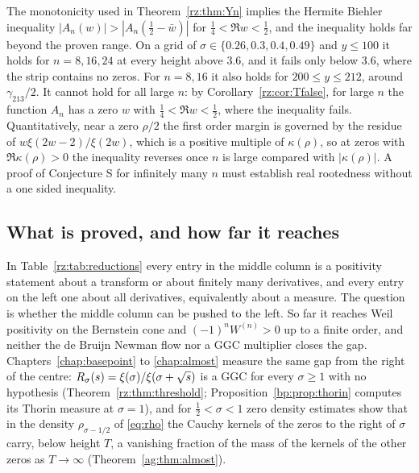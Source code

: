 The monotonicity used in Theorem~\ref{rz:thm:Yn} implies the Hermite Biehler inequality $|A_n(w)|>|A_n(\frac12-\bar w)|$ for $\frac14<\Re w<\frac12$, and the inequality holds far beyond the proven range. On a grid of $\sigma\in\{0.26,0.3,0.4,0.49\}$ and $y\le100$ it holds for $n=8,16,24$ at every height above $3.6$, and it fails only below $3.6$, where the strip contains no zeros. For $n=8,16$ it also holds for $200\le y\le212$, around $\gamma_{213}/2$. It cannot hold for all large $n$: by Corollary~\ref{rz:cor:Tfalse}, for large $n$ the function $A_n$ has a zero $w$ with $\frac14<\Re w<\frac12$, where the inequality fails. Quantitatively, near a zero $\rho/2$ the first order margin is governed by the residue of $w\xi(2w-2)/\xi(2w)$, which is a positive multiple of $\kappa(\rho)$, so at zeros with $\Re\kappa(\rho)>0$ the inequality reverses once $n$ is large compared with $|\kappa(\rho)|$. A proof of Conjecture S for infinitely many $n$ must establish real rootedness without a one sided inequality.

\subsection{What is proved, and how far it reaches}\label{rz:sec:towards}

In Table~\ref{rz:tab:reductions} every entry in the middle column is a positivity statement about a transform or about finitely many derivatives, and every entry on the left one about all derivatives, equivalently about a measure. The question is whether the middle column can be pushed to the left. So far it reaches Weil positivity on the Bernstein cone and $(-1)^nW^{(n)}>0$ up to a finite order, and neither the de Bruijn Newman flow nor a GGC multiplier closes the gap. Chapters~\ref{chap:basepoint} to \ref{chap:almost} measure the same gap from the right of the centre: $R_\sigma(s)=\xi(\sigma)/\xi(\sigma+\sqrt{s})$ is a GGC for every $\sigma\ge1$ with no hypothesis (Theorem~\ref{rz:thm:threshold}; Proposition~\ref{bp:prop:thorin} computes its Thorin measure at $\sigma=1$), and for $\frac12<\sigma<1$ zero density estimates show that in the density $\rho_{\sigma-1/2}$ of \eqref{eq:rho} the Cauchy kernels of the zeros to the right of $\sigma$ carry, below height $T$, a vanishing fraction of the mass of the kernels of the other zeros as $T\to\infty$ (Theorem~\ref{ag:thm:almost}).

